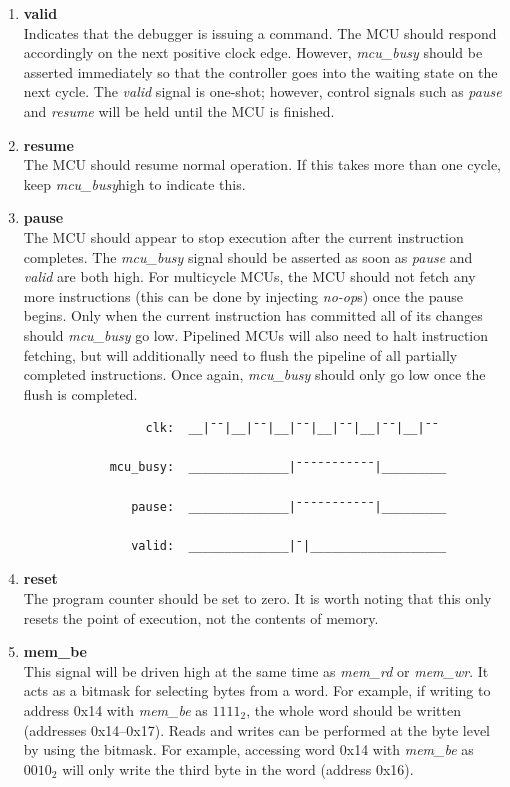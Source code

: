 \documentclass[10pt,a4paper]{article}
\begin{document}
\begin{enumerate}

    \item\textbf{valid}\\
    Indicates that the debugger is issuing a command. The MCU should respond accordingly on the next
    positive clock edge. However, \emph{mcu\_busy} should be asserted immediately so that the
    controller goes into the waiting state on the next cycle. The \emph{valid} signal is one-shot;
    however, control signals such as \emph{pause} and \emph{resume} will be held until the MCU is
    finished.

    \item\textbf{resume}\\
    The MCU should resume normal operation. If this takes more than one cycle,
    keep \emph{mcu\_busy}high to indicate this.

    \item\textbf{pause}\\
    The MCU should appear to stop execution after the current instruction completes. The
    \emph{mcu\_busy} signal should be asserted as soon as \emph{pause} and \emph{valid} are both
    high. For multicycle MCUs, the MCU should not fetch any more instructions (this can be done by
    injecting \emph{no-op}s) once the pause begins. Only when the current instruction has committed
    all of its changes should \emph{mcu\_busy} go low. Pipelined MCUs will also need to halt
    instruction fetching, but will additionally need to flush the pipeline of all partially completed
    instructions. Once again, \emph{mcu\_busy} should only go low once the flush is completed.

        \begin{verbatim}
                 clk:  __|¯¯|__|¯¯|__|¯¯|__|¯¯|__|¯¯|__|¯¯

            mcu_busy:  ______________|¯¯¯¯¯¯¯¯¯¯¯|_________

               pause:  ______________|¯¯¯¯¯¯¯¯¯¯¯|_________

               valid:  ______________|¯|___________________
        \end{verbatim}

    \item\textbf{reset}\\
    The program counter should be set to zero. It is worth noting that this only resets the point of
    execution, not the contents of memory.

    \item\textbf{mem\_be}\\
    This signal will be driven high at the same time as \emph{mem\_rd} or \emph{mem\_wr}. It acts as
    a bitmask for selecting bytes from a word. For example, if writing to address 0x14 with
    \emph{mem\_be} as $1111_{2}$, the whole word should be written (addresses 0x14--0x17).
    Reads and writes can be performed at the byte level by using the
    bitmask. For example, accessing word 0x14 with \emph{mem\_be} as $0010_{2}$ will
    only write the third byte in the word (address 0x16).


\end{enumerate}
\end{document}
